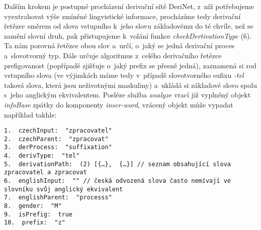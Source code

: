 Dalším krokem je postupné procházení derivační sítě DeriNet, z~níž
potřebujeme vyextrahovat výše zmíněné lingvistické informace, procházíme
tedy derivační řetězec směrem od slova vstupního k~jeho slovu
základovému do té chvíle, než se zamění slovní druh, pak přistupujeme
k~volání funkce \emph{checkDertivationType} (6). Ta nám porovná řetězce
obou slov a~určí, o~jaký se jedná derivační proces a~slovotvorný typ.
Dále určuje algoritmus z~celého derivačního řetězce prefigovanost
(popřípadě zjišťuje o~jaký prefix se přesně jedná), zaznamená si rod
vstupního slova (ve výjimkách máme tedy v~případě slovotvorného sufixu
\emph{-tel} taková slova, která jsou neživotnými maskuliny) a~ukládá si
základové slovo spolu s~jeho anglickým ekvivalentem. Posléze služba
\emph{analyze} vrací již vyplněný objekt \emph{infoBase} zpátky do
komponenty \emph{inser-word}, vrácený objekt může vypadat například
takhle:

\begin{verbatim}
1.  czechInput:  "zpracovatel"
2.  czechParent:  "zpracovat"
3.  derProcess:  "suffixation"
4.  derivType:  "tel"
5.  derivationPath:  (2) [{…},  {…}] // seznam obsahující slova zpracovatel a zpracovat
6.  englishInput:  "" // česká odvozená slova často nemívají ve slovníku svůj anglický ekvivalent
7.  englishParent:  "processs"
8.  gender:  "M"
9.  isPrefig:  true
10.  prefix:  "z"
\end{verbatim}
